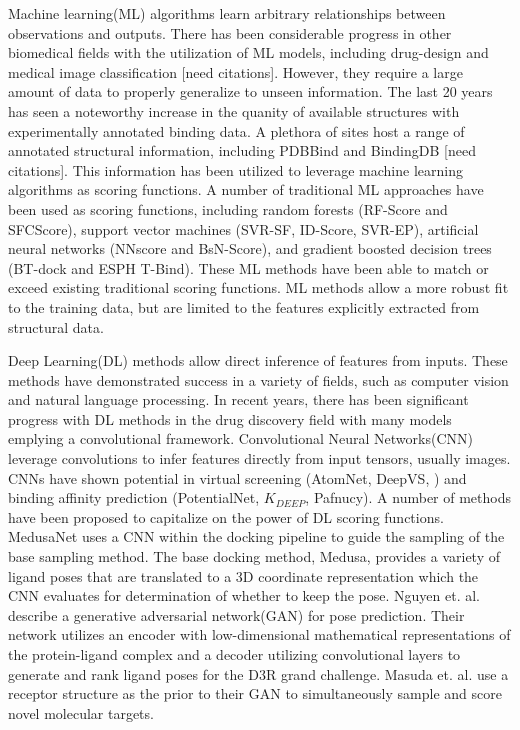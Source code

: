 \documentclass[journal=jcisd8,manuscript=article]{achemso}
\begin{document}
Machine learning(ML) algorithms learn arbitrary relationships between observations and outputs. There has been considerable progress in other biomedical fields with the utilization of ML models, including drug-design and medical image classification [need citations]. However, they require a large amount of data to properly generalize to unseen information. The last 20 years has seen a noteworthy increase in the quanity of available structures with experimentally annotated binding data\cite{}. A plethora of sites host a range of annotated structural information, including PDBBind and BindingDB [need citations]. This information has been utilized to leverage machine learning algorithms as scoring functions. A number of traditional ML approaches have been used as scoring functions, including random forests (RF-Score and SFCScore), support vector machines (SVR-SF, ID-Score, SVR-EP), artificial neural networks (NNscore and BsN-Score), and gradient boosted decision trees (BT-dock and ESPH T-Bind)\cite{liu2017forging,zilian2013sfcscore,li2011svr,li2013idscore,durrant2010nnscore,ashtawy2015bsn,btdock,cang2018integration}. These ML methods have been able to match or exceed existing traditional scoring functions. ML methods allow a more robust fit to the training data, but are limited to the features explicitly extracted from structural data.

Deep Learning(DL) methods allow direct inference of features from inputs. These methods have demonstrated success in a variety of fields, such as computer vision and natural language processing\cite{krizhevsky2017imagenet,brown2020language}. In recent years, there has been significant progress with DL methods in the drug discovery field with many models emplying a convolutional framework. Convolutional Neural Networks(CNN) leverage convolutions to infer features directly from input tensors, usually images. CNNs have shown potential in virtual screening (AtomNet, DeepVS, \cite{Ragoza2017}) and binding affinity prediction (PotentialNet, $K_{DEEP}$, Pafnucy)\cite{wallach2015atomnet,jimenez2018k,pereira2016boosting,feinberg2018potentialnet,stepniewska2018development}. A number of methods have been proposed to capitalize on the power of DL scoring functions. MedusaNet uses a CNN within the docking pipeline to guide the sampling of the base sampling method\cite{jiang2020guiding}. The base docking method, Medusa, provides a variety of ligand poses that are translated to a 3D coordinate representation which the CNN evaluates for determination of whether to keep the pose. Nguyen et. al. \cite{nguyen2020mathdl} describe a generative adversarial network(GAN) for pose prediction. Their network utilizes an encoder with low-dimensional mathematical representations of the protein-ligand complex and a decoder utilizing convolutional layers to generate and rank ligand poses for the D3R grand challenge. Masuda et. al. \cite{masuda2020generating} use a receptor structure as the prior to their GAN to simultaneously sample and score novel molecular targets.
\end{document}
